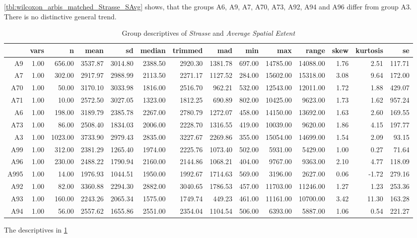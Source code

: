 \cref{tbl:wilcoxon_arbis_matched_Strasse_SAvg} shows, that the groups A6, A9, A7, A70, A73, A92, A94 and A96 differ from group A3. There is no distinctive general trend.
\begin{table}[ht!]
	\tiny
	\centering
	\begin{tabular}{rrrrrrrrrrrrrr}
		\hline
		& vars & n & mean & sd & median & trimmed & mad & min & max & range & skew & kurtosis & se \\ 
		\hline
		A9   & 1.00 & 656.00 & 3537.87 & 3014.80 & 2388.50 & 2920.30 & 1381.78 & 697.00 & 14785.00 & 14088.00 & 1.76 & 2.51 & 117.71 \\ 
		A7   & 1.00 & 302.00 & 2917.97 & 2988.99 & 2113.50 & 2271.17 & 1127.52 & 284.00 & 15602.00 & 15318.00 & 3.08 & 9.64 & 172.00 \\ 
		A70  & 1.00 & 50.00 & 3170.10 & 3033.98 & 1816.00 & 2516.70 & 962.21 & 532.00 & 12543.00 & 12011.00 & 1.72 & 1.88 & 429.07 \\ 
		A71  & 1.00 & 10.00 & 2572.50 & 3027.05 & 1323.00 & 1812.25 & 690.89 & 802.00 & 10425.00 & 9623.00 & 1.73 & 1.62 & 957.24 \\ 
		A6   & 1.00 & 198.00 & 3189.79 & 2385.78 & 2267.00 & 2780.79 & 1272.07 & 458.00 & 14150.00 & 13692.00 & 1.63 & 2.60 & 169.55 \\ 
		A73  & 1.00 & 86.00 & 2508.40 & 1834.03 & 2006.00 & 2228.70 & 1316.55 & 419.00 & 10039.00 & 9620.00 & 1.86 & 4.15 & 197.77 \\ 
		A3   & 1.00 & 1023.00 & 3733.90 & 2979.43 & 2835.00 & 3227.67 & 2269.86 & 355.00 & 15054.00 & 14699.00 & 1.54 & 2.09 & 93.15 \\ 
		A99  & 1.00 & 312.00 & 2381.29 & 1265.40 & 1974.00 & 2225.76 & 1073.40 & 502.00 & 5931.00 & 5429.00 & 1.00 & 0.27 & 71.64 \\ 
		A96  & 1.00 & 230.00 & 2488.22 & 1790.94 & 2160.00 & 2144.86 & 1068.21 & 404.00 & 9767.00 & 9363.00 & 2.10 & 4.77 & 118.09 \\ 
		A995 & 1.00 & 14.00 & 1976.93 & 1044.51 & 1950.00 & 1992.67 & 1714.63 & 569.00 & 3196.00 & 2627.00 & 0.06 & -1.72 & 279.16 \\ 
		A92  & 1.00 & 82.00 & 3360.88 & 2294.30 & 2882.00 & 3040.65 & 1786.53 & 457.00 & 11703.00 & 11246.00 & 1.27 & 1.23 & 253.36 \\ 
		A93  & 1.00 & 160.00 & 2243.26 & 2065.34 & 1575.00 & 1749.74 & 449.23 & 461.00 & 11161.00 & 10700.00 & 3.42 & 11.30 & 163.28 \\  
		A94  & 1.00 & 56.00 & 2557.62 & 1655.86 & 2551.00 & 2354.04 & 1104.54 & 506.00 & 6393.00 & 5887.00 & 1.06 & 0.54 & 221.27 \\ 
		\bottomrule
	\end{tabular}
	\caption{Group descriptives of \textit{Strasse} and \textit{Average Spatial Extent}}
	\label{tbl:descriptives_arbis_matched_Strasse_SAvg}
\end{table}
The descriptives in \cref{tbl:descriptives_arbis_matched_Strasse_SAvg}


